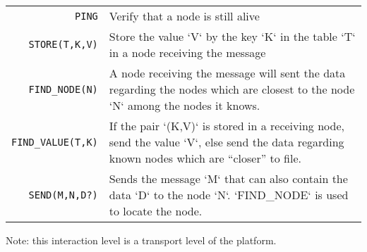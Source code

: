 \begin{tabular}{r|p{13cm}}

  \texttt{PING} & \small Verify that a node is still alive\\

  \texttt{STORE(T,K,V)} & \small Store the value `V` by the key `K` in the table `T` in a node receiving the message\\

  \texttt{FIND\_NODE(N)} & \small A node receiving the message will sent the data regarding the nodes which are closest to the node `N` among the nodes it knows.\\

  \texttt{FIND\_VALUE(T,K)} & \small If the pair `(K,V)` is stored in a receiving node, send the value `V`, else send the data regarding known nodes which are “closer” to file.\\

  \texttt{SEND(M,N,D?)} & \small Sends the message `M` that can also contain the data `D` to the node `N`. `FIND\_NODE` is used to locate the node.

\end{tabular}

\begin{note}
Note: this interaction level is a transport level of the platform.
\end{note}



%
%
%

